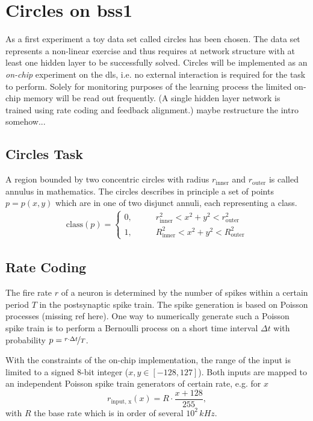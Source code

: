 \section{Circles on \gls{bss1}}
As a first experiment a toy data set called circles has been chosen. The data set represents a non-linear exercise and thus requires at network structure with at least one hidden layer to be successfully solved. Circles will be implemented as an \textit{on-chip} experiment on the \gls{dls}, i.e. no external interaction is required for the task to perform. Solely for monitoring purposes of the learning process the limited on-chip memory will be read out frequently. (A single hidden layer network is trained using rate coding and feedback alignment.) maybe restructure the intro somehow...

\subsection{Circles Task}
A region bounded by two concentric circles with radius $r_{\text{inner}}$ and $r_{\text{outer}}$ is called annulus in mathematics. The circles describes in principle a set of points $p = p(x,y)$ which are in one of two disjunct annuli, each representing a class.
\begin{align}
\text{class}(p) =
	\begin{cases}
		0 ,&\quad \quad r_{\text{inner}}^2 < x^2 + y^2 < r_{\text{outer}}^2 \\
		1 ,&\quad \quad R_{\text{inner}}^2 < x^2 + y^2 < R_{\text{outer}}^2
	\end{cases}
\end{align}

\subsection{Rate Coding}
The fire rate $r$ of a neuron is determined by the number of spikes within a certain period $T$ in the postsynaptic spike train. The spike generation is based on Poisson processes (missing ref here). One way to numerically generate such a Poisson spike train is to perform a Bernoulli process on a short time interval $\Delta t$ with probability $p = \nicefrac{r \cdot \Delta t}{T}$.

With the constraints of the on-chip implementation, the range of the input is limited to a signed 8-bit integer ($x, y \in [-128,127]$). Both inputs are mapped to an independent Poisson spike train generators of certain rate, e.g. for $x$
\begin{equation}\label{key}
r_{\text{input, x}}(x) = R \cdot \frac{x + 128}{255},
\end{equation}
with $R$ the base rate which is in order of several $10^2 \, \si{kHz}$. 

